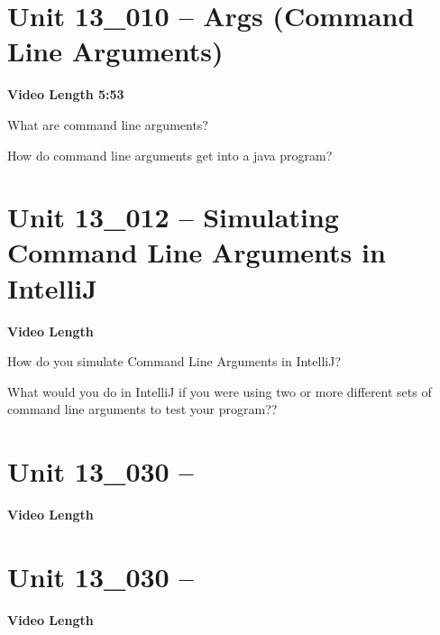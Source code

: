 \documentclass[letterpaper,12pt]{exam}
\newcommand{\unit}{Unit 13}
\begin{document}
\section*{\unit\_010 -- Args (Command Line Arguments)} 
\par{\selectfont\textbf{Video Length 5:53}}
\begin{questions}
\begin{samepage}
    \question What are command line arguments?
    \vspace{5mm}
\end{samepage}
\begin{samepage}
    \question How do command line arguments get into a java program?
    \vspace{5mm}
\end{samepage}

\section*{\unit\_012 -- Simulating Command Line Arguments in IntelliJ} 
\par{\selectfont\textbf{Video Length }}

\begin{samepage}
    \question How do you simulate Command Line Arguments in IntelliJ?
    \vspace{5mm}
\end{samepage}

\begin{samepage}
    \question What would you do in IntelliJ if you were using two or more different sets of command line arguments to test your program??
    \vspace{5mm}
\end{samepage}
\section*{\unit\_030 -- } 
\par{\selectfont\textbf{Video Length }}

\section*{\unit\_030 -- } 
\par{\selectfont\textbf{Video Length }}


\end{questions}
\end{document}
